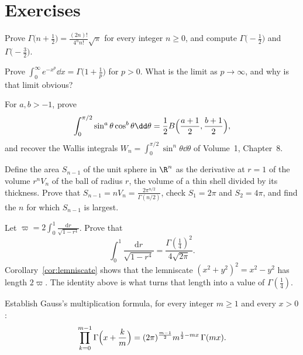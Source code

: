 \section{Exercises}

\begin{exercise}[$\star$]\label{ex:halfint}
Prove $\Gamma\bigl(n+\frac12\bigr)=\frac{(2n)!}{4^nn!}\sqrt\pi$ for every integer $n\ge0$, and compute $\Gamma\bigl(-\frac12\bigr)$ and $\Gamma\bigl(-\frac32\bigr)$.
\end{exercise}

\begin{exercise}[$\star$]\label{ex:expp}
Prove $\int_0^\infty e^{-x^p}\dd x=\Gamma\bigl(1+\frac1p\bigr)$ for $p>0$. What is the limit as $p\to\infty$, and why is that limit obvious?
\end{exercise}

\begin{exercise}[$\star\star$]\label{ex:sincos}
For $a,b>-1$, prove
\[
\int_0^{\pi/2}\sin^a\theta\cos^b\theta\dd\theta=\frac12B\Bigl(\frac{a+1}2,\frac{b+1}2\Bigr),
\]
and recover the Wallis integrals $W_n=\int_0^{\pi/2}\sin^n\theta\dd\theta$ of Volume~1, Chapter~8.
\end{exercise}

\begin{exercise}[$\star\star$]\label{ex:sphere}
Define the area $S_{n-1}$ of the unit sphere in $\R^n$ as the derivative at $r=1$ of the volume $r^nV_n$ of the ball of radius $r$, the volume of a thin shell divided by its thickness. Prove that $S_{n-1}=nV_n=\frac{2\pi^{n/2}}{\Gamma(n/2)}$, check $S_1=2\pi$ and $S_2=4\pi$, and
find the $n$ for which $S_{n-1}$ is largest.
\end{exercise}

\begin{exercise}[$\star\star$]\label{ex:lemniscate}
Let $\varpi=2\int_0^1\frac{\mathrm dr}{\sqrt{1-r^4}}$. Prove that
\[
\int_0^1\frac{\mathrm dr}{\sqrt{1-r^4}}=\frac{\Gamma(\frac14)^2}{4\sqrt{2\pi}}.
\]
Corollary~\ref{cor:lemniscate} shows that the lemniscate $(x^2+y^2)^2=x^2-y^2$ has length $2\varpi$. The identity above is what turns that length into a value of $\Gamma(\frac14)$.
\end{exercise}

\begin{exercise}[$\star\star\star$]\label{ex:multiplication}
Establish Gauss's multiplication formula, for every integer $m\ge1$ and every $x>0$:
\[
\prod_{k=0}^{m-1}\Gamma\Bigl(x+\frac km\Bigr)=(2\pi)^{\frac{m-1}2}m^{\frac12-mx}\,\Gamma(mx).
\]
\end{exercise}

